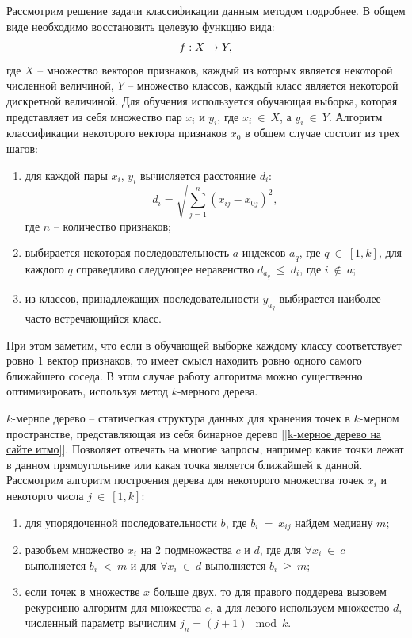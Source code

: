 \documentclass[14pt, a4paper]{extreport}
\begin{document}
	Рассмотрим решение задачи классификации данным методом подробнее. В общем виде необходимо восстановить целевую функцию вида:
	\vspace*{-0.5cm}
	\begin{equation*}
		f: X \rightarrow Y, 
		\label{KNNf}
		\vspace*{-0.5cm}
	\end{equation*}
	где $X$ -- множество векторов признаков, каждый из которых является некоторой численной величиной, $Y$ -- множество классов, каждый класс является некоторой дискретной величиной. Для обучения используется обучающая выборка, которая представляет из себя множество пар $x_i$ и $y_i$, где $x_i~\in~X$, а $y_i~\in~Y$.
	Алгоритм классификации некоторого вектора признаков $x_0$ в общем случае состоит из трех шагов:
	\begin{enumerate}[label={\arabic*)}]
		\item для каждой пары $x_i$, $y_i$ вычисляется расстояние $d_i$:
		\begin{equation*}
			d_i = \sqrt{\sum\limits_{j=1}^n (x_{ij} - x_{0j})^2}, 
			\label{disqrt}
		\end{equation*}
		где $n$ -- количество признаков;
		\item выбирается некоторая последовательность $a$ индексов $a_q$, где \linebreak $q~\in~[1, k]$, для каждого $q$ справедливо следующее неравенство $d_{a_q}~\le~d_{i}$, где $i~\notin~a$;
		\item из классов, принадлежащих последовательности $y_{a_q}$ выбирается наиболее часто встречающийся класс.
	\end{enumerate}
	
	При этом заметим, что если в обучающей выборке каждому классу соответствует ровно 1 вектор признаков, то имеет смысл находить ровно одного самого ближайшего соседа.
	В этом случае работу алгоритма можно существенно оптимизировать, используя метод $k$-мерного дерева.
	
	$k$-мерное дерево -- статическая структура данных для хранения точек в $k$-мерном пространстве, представляющая из себя бинарное дерево [\ref{k-мерное дерево на сайте итмо}]. Позволяет отвечать на многие запросы, например какие точки лежат в данном прямоугольнике или какая точка является ближайшей к данной. Рассмотрим алгоритм построения дерева для некоторого множества точек $x_i$ и некоторго числа $j~\in~[1, k]$:
	\begin{enumerate}[label={\arabic*)}]
		\item для упорядоченной последовательности $b$, где $b_i~=~x_{ij}$ найдем медиану $m$;
		\item разобъем множество $x_i$ на 2 подмножества $c$ и $d$, где для $\forall x_i~\in~c$ выполняется $b_i~<~m$ и для $\forall x_i~\in~d$ выполняется $b_i~\ge~m$;
		\item если точек в множестве $x$ больше двух, то для правого поддерева вызовем рекурсивно алгоритм для множества $c$, а для левого используем множество $d$, численный параметр вычислим $j_{n}=(j + 1) \mod k$. 
	\end{enumerate}
	
\end{document}
